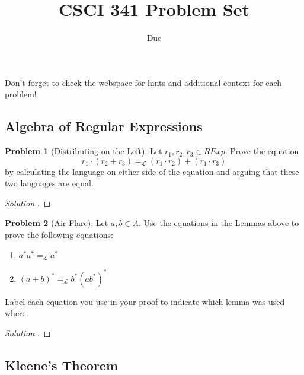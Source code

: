 \documentclass[11pt]{article}
\title{CSCI 341 Problem Set \pset}
\author{\subtitle}
\date{Due
    \duedate
}
\theoremstyle{theorem} %
\theoremstyle{definition} %
\newtheorem{problem}                    {{\color{BurntOrange}Problem}}
\theoremstyle{remark} %
\begin{document}
\maketitle

Don't forget to check the webspace for hints and additional context for each problem!

\subsection*{Algebra of Regular Expressions}

\begin{problem}
    [Distributing on the Left]
    Let \(r_1,r_2,r_3 \in \mathit{RExp}\).
    Prove the equation 
    \[r_1 \cdot (r_2 + r_3) =_{\mathcal L} (r_1 \cdot r_2) + (r_1 \cdot r_3)\]
    by calculating the language on either side of the equation and arguing that these two languages are equal.   
\end{problem}

\begin{proof}[Solution.]
    
\end{proof}

\begin{problem}
    [Air Flare]
    Let \(a,b \in A\).
    Use the equations in the Lemmas above to prove the following equations:
    \begin{enumerate}
        \item \(a^*a^* =_{\mathcal L} a^*\)
        \item \((a + b)^* =_{\mathcal L} b^*(ab^*)^*\)
    \end{enumerate}
    Label each equation you use in your proof to indicate which lemma was used where.  
\end{problem}

\begin{proof}[Solution.]
    
\end{proof}

\subsection*{Kleene's Theorem}
\end{document}
